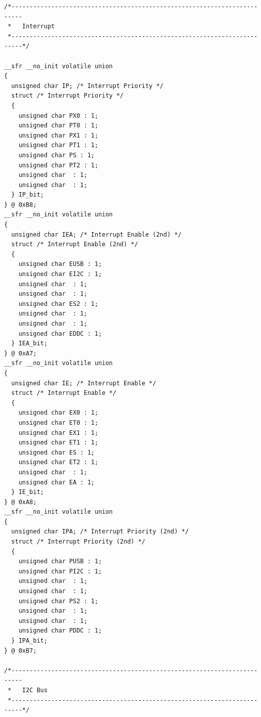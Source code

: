 \documentclass[10pt,a4paper,final]{article}
\begin{document}
\begin{lstlisting}[label={list:first},caption=Code source]
/*-------------------------------------------------------------------------
 *   Interrupt
 *-------------------------------------------------------------------------*/

__sfr __no_init volatile union
{
  unsigned char IP; /* Interrupt Priority */
  struct /* Interrupt Priority */
  {
    unsigned char PX0 : 1;
    unsigned char PT0 : 1;
    unsigned char PX1 : 1;
    unsigned char PT1 : 1;
    unsigned char PS : 1;
    unsigned char PT2 : 1;
    unsigned char  : 1;
    unsigned char  : 1;
  } IP_bit;
} @ 0xB8;
__sfr __no_init volatile union
{
  unsigned char IEA; /* Interrupt Enable (2nd) */
  struct /* Interrupt Enable (2nd) */
  {
    unsigned char EUSB : 1;
    unsigned char EI2C : 1;
    unsigned char  : 1;
    unsigned char  : 1;
    unsigned char ES2 : 1;
    unsigned char  : 1;
    unsigned char  : 1;
    unsigned char EDDC : 1;
  } IEA_bit;
} @ 0xA7;
__sfr __no_init volatile union
{
  unsigned char IE; /* Interrupt Enable */
  struct /* Interrupt Enable */
  {
    unsigned char EX0 : 1;
    unsigned char ET0 : 1;
    unsigned char EX1 : 1;
    unsigned char ET1 : 1;
    unsigned char ES : 1;
    unsigned char ET2 : 1;
    unsigned char  : 1;
    unsigned char EA : 1;
  } IE_bit;
} @ 0xA8;
__sfr __no_init volatile union
{
  unsigned char IPA; /* Interrupt Priority (2nd) */
  struct /* Interrupt Priority (2nd) */
  {
    unsigned char PUSB : 1;
    unsigned char PI2C : 1;
    unsigned char  : 1;
    unsigned char  : 1;
    unsigned char PS2 : 1;
    unsigned char  : 1;
    unsigned char  : 1;
    unsigned char PDDC : 1;
  } IPA_bit;
} @ 0xB7;

/*-------------------------------------------------------------------------
 *   I2C Bus
 *-------------------------------------------------------------------------*/


\end{lstlisting}
\end{document}
